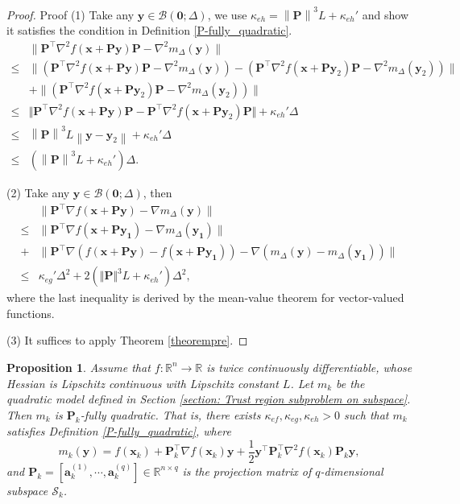 \documentclass[colorlinks=true, linkcolor=blue, citecolor=blue, urlcolor=blue]{article}
\theoremstyle{plain}
\newtheorem{proposition}[theorem]{Proposition}
\theoremstyle{definition}
\theoremstyle{remark}
\newcommand{\ul}{\boldsymbol}
\newcommand{\ml}{\boldsymbol}
\newcommand{\norm}[1]{\left\lVert#1\right\rVert}
\begin{document}
\begin{proof}{Proof}
  (1) Take any $\ul{y} \in \mathcal{B}(\ul{0}; \Delta)$, we use $\kappa_{eh}= \norm{\bm P}^3 L + \kappa_{eh}'$ and show it satisfies the condition in Definition \ref{P-fully_quadratic}.
  \[
    \begin{aligned}
      &\|\ml{P}^{\top} \nabla^2 f(\bm x + \bm P \bm y) \ml{P} -\nabla^2 m_{\Delta}(\bm y)\|\\ 
      \leq& \|(\ml{P}^{\top} \nabla^2 f(\bm x+\bm P\bm y) \bm{P} -\nabla^2 m_{\Delta}(\bm y)) - (\bm{P}^{\top} \nabla^2 f(\bm x + \bm{P} \bm y_2) \bm{P} -\nabla^2 m_{\Delta}(\bm y_2))\| \\
      &+ \|(\bm{P}^{\top} \nabla^2 f(\bm x + \bm{P} \bm y_2) \bm{P} -\nabla^2 m_{\Delta}(\bm y_2))\|\\
      \leq& \Vert\bm{P}^{\top} \nabla^2 f(\bm x + \bm{P} \bm y) \bm{P}-\bm{P}^{\top} \nabla^2 f(\bm x + \bm{P} \bm y_2) \bm{P} \Vert + \kappa_{eh}' \Delta\\
      \leq& \norm{\bm{P}}^3 L \norm{\bm{y} - \bm{y}_2} + \kappa_{eh}' \Delta\\
      \leq& (\norm{\bm{P}}^3 L + \kappa_{eh}') \Delta.
    \end{aligned}
  \]

  (2) Take any $\ul{y} \in \mathcal{B}(\ul{0}; \Delta)$, then 
  \[
    \begin{aligned}
      &\|\ml{P}^{\top} \nabla f(\ul{x + P y})-\nabla m_{\Delta}(\ul{y})\| \\
      \leq& \|\ml{P}^{\top} \nabla f(\ul{x + P y_1})-\nabla m_{\Delta}(\ul{y_1})\|\\
      +& \|\ml{P}^{\top} \nabla (f(\ul{x + P y}) - f(\ul{x + P y_1})) -\nabla (m_{\Delta}(\ul{y}) - m_{\Delta}(\ul{y_1}))\| \\
      \leq& \kappa_{eg}' \Delta^2 + 2(\Vert\bm{P}\Vert^3 L + \kappa_{eh}') \Delta^2,
    \end{aligned}
  \]
  where the last inequality is derived by the mean-value theorem for vector-valued functions.
    
  (3) It suffices to apply Theorem \ref{theorempre}.  
  \end{proof}

\begin{proposition}\label{prop: m_k fully quadratic}
    Assume that $f:\mathbb{R}^n\to\mathbb{R}$ is twice continuously differentiable, whose Hessian is Lipschitz continuous with Lipschitz constant $L$. Let $m_k$ be the quadratic model defined in Section \ref{section: Trust region subproblem on subspace}. Then $m_k$ is $\bm P_k$-fully quadratic. That is, there exists $\kappa_{ef}, \kappa_{eg}, \kappa_{eh} > 0$ such that $m_k$ satisfies Definition \ref{P-fully_quadratic}, where
    \begin{equation*}
        m_k(\bm y)= f(\bm{x}_k)+\bm{P}_k^\top \nabla f(\bm{x}_k) \bm y+\frac{1}{2}\bm y^{\top}\bm{P}_k^\top\nabla^2f(\bm{x}_k)\bm{P}_k\bm y,
    \end{equation*}
    and $\bm{P}_k=[\bm{a}_k^{(1)},\cdots,\bm{a}_k^{(q)}]\in\mathbb{R}^{n\times q}$ is the projection matrix of {\color{black}$q$}-dimensional subspace $\mathcal{S}_k$.
\end{proposition}
\end{document}
